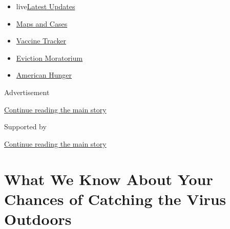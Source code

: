 \begin{itemize}
\tightlist
\item
  live\href{https://www.nytimes3xbfgragh.onion/2020/09/08/world/covid-19-coronavirus.html?name=styln-coronavirus-national\&region=TOP_BANNER\&block=storyline_menu_recirc\&action=click\&pgtype=Article\&impression_id=1a3fae51-f1bf-11ea-ac7c-bfa2516a0867\&variant=undefined}{Latest
  Updates}
\item
  \href{https://www.nytimes3xbfgragh.onion/interactive/2020/us/coronavirus-us-cases.html?name=styln-coronavirus-national\&region=TOP_BANNER\&block=storyline_menu_recirc\&action=click\&pgtype=Article\&impression_id=1a3fae52-f1bf-11ea-ac7c-bfa2516a0867\&variant=undefined}{Maps
  and Cases}
\item
  \href{https://www.nytimes3xbfgragh.onion/interactive/2020/science/coronavirus-vaccine-tracker.html?name=styln-coronavirus-national\&region=TOP_BANNER\&block=storyline_menu_recirc\&action=click\&pgtype=Article\&impression_id=1a3fae53-f1bf-11ea-ac7c-bfa2516a0867\&variant=undefined}{Vaccine
  Tracker}
\item
  \href{https://www.nytimes3xbfgragh.onion/2020/09/02/your-money/eviction-moratorium-covid.html?name=styln-coronavirus-national\&region=TOP_BANNER\&block=storyline_menu_recirc\&action=click\&pgtype=Article\&impression_id=1a3fae54-f1bf-11ea-ac7c-bfa2516a0867\&variant=undefined}{Eviction
  Moratorium}
\item
  \href{https://www.nytimes3xbfgragh.onion/interactive/2020/09/02/magazine/food-insecurity-hunger-us.html?name=styln-coronavirus-national\&region=TOP_BANNER\&block=storyline_menu_recirc\&action=click\&pgtype=Article\&impression_id=1a3fae55-f1bf-11ea-ac7c-bfa2516a0867\&variant=undefined}{American
  Hunger}
\end{itemize}

Advertisement

\protect\hyperlink{after-top}{Continue reading the main story}

Supported by

\protect\hyperlink{after-sponsor}{Continue reading the main story}

\hypertarget{what-we-know-about-your-chances-of-catching-the-virus-outdoors}{%
\section{What We Know About Your Chances of Catching the Virus
Outdoors}\label{what-we-know-about-your-chances-of-catching-the-virus-outdoors}}

